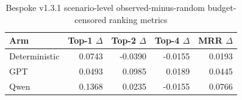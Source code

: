 \begin{table}[htbp]
\centering
\caption{Bespoke v1.3.1 scenario-level observed-minus-random budget-censored ranking metrics}
\begin{tabular}{lrrrr}
\hline
Arm & Top-1 $\Delta$ & Top-2 $\Delta$ & Top-4 $\Delta$ & MRR $\Delta$ \\
\hline
Deterministic & 0.0743 & -0.0390 & -0.0155 & 0.0193 \\
GPT & 0.0493 & 0.0985 & 0.0189 & 0.0445 \\
Qwen & 0.1368 & 0.0235 & -0.0155 & 0.0766 \\
\hline
\end{tabular}
\end{table}
